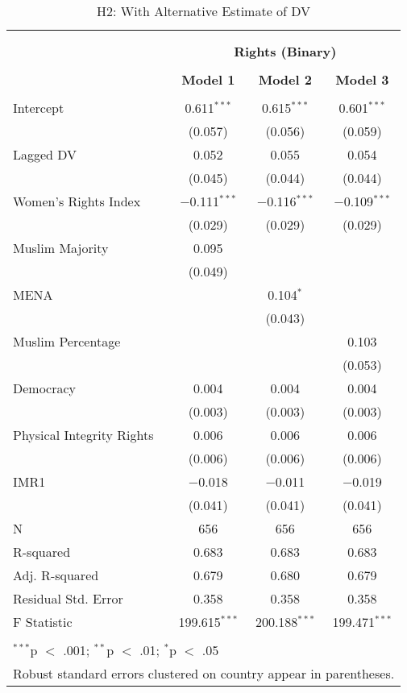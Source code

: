 
\begin{table}[!htbp] \centering 
  \caption{H2: With Alternative Estimate of DV} 
  \label{} 
\begin{tabular}{@{\extracolsep{5pt}}lccc} 
\\[-1.8ex]\hline \\[-1.8ex] 
\\[-1.8ex] & \multicolumn{3}{c}{\textbf{Rights (Binary)}} \\ 
\\[-1.8ex] & \textbf{Model 1} & \textbf{Model 2} & \textbf{Model 3}\\ 
\hline \\[-1.8ex] 
 Intercept & 0.611$^{***}$ & 0.615$^{***}$ & 0.601$^{***}$ \\ 
  & (0.057) & (0.056) & (0.059) \\ 
  Lagged DV & 0.052 & 0.055 & 0.054 \\ 
  & (0.045) & (0.044) & (0.044) \\ 
  Women's Rights Index & $-$0.111$^{***}$ & $-$0.116$^{***}$ & $-$0.109$^{***}$ \\ 
  & (0.029) & (0.029) & (0.029) \\ 
  Muslim Majority & 0.095 &  &  \\ 
  & (0.049) &  &  \\ 
  MENA &  & 0.104$^{*}$ &  \\ 
  &  & (0.043) &  \\ 
  Muslim Percentage &  &  & 0.103 \\ 
  &  &  & (0.053) \\ 
  Democracy & 0.004 & 0.004 & 0.004 \\ 
  & (0.003) & (0.003) & (0.003) \\ 
  Physical Integrity Rights & 0.006 & 0.006 & 0.006 \\ 
  & (0.006) & (0.006) & (0.006) \\ 
  IMR1 & $-$0.018 & $-$0.011 & $-$0.019 \\ 
  & (0.041) & (0.041) & (0.041) \\ 
 N & 656 & 656 & 656 \\ 
R-squared & 0.683 & 0.683 & 0.683 \\ 
Adj. R-squared & 0.679 & 0.680 & 0.679 \\ 
Residual Std. Error & 0.358 & 0.358 & 0.358 \\ 
F Statistic & 199.615$^{***}$ & 200.188$^{***}$ & 199.471$^{***}$ \\ 
\hline \\[-1.8ex] 
\multicolumn{4}{l}{$^{***}$p $<$ .001; $^{**}$p $<$ .01; $^{*}$p $<$ .05} \\ 
\multicolumn{4}{l}{Robust standard errors clustered on country appear in parentheses.} \\ 
\end{tabular} 
\end{table} 
